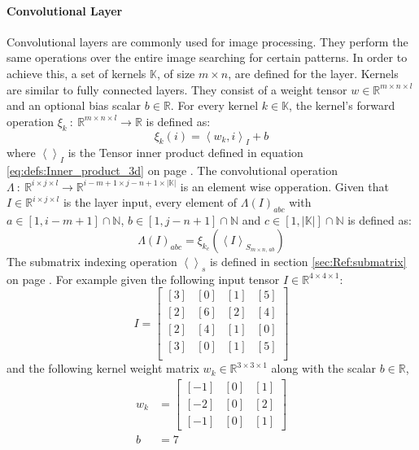 \documentclass[12pt]{article}
\newcommand{\equationref}[1]{equation \ref{#1} on page \pageref{#1}}
\newcommand{\sectionref}[1]{section \ref{#1} on page \pageref{#1}}
\begin{document}
\paragraph{Convolutional Layer}
Convolutional layers are commonly used for image processing. They perform the same operations over the entire image searching for certain patterns. In order to achieve this, a set of kernels \(\mathbb{K}\), of size \(m\times n\), are defined for the layer. Kernels are similar to fully connected layers. They consist of a weight tensor \(w\in\mathbb{R}^{m \times n \times l}\) and an optional bias scalar \(b\in\mathbb{R}\). For every kernel \(k\in \mathbb{K}\), the kernel's forward operation \(\xi_k~:~\mathbb{R}^{m \times n \times l}\to\mathbb{R}\) is defined as:
\begin{equation}\label{eq:NN:kernelOpperation}
\xi_k(i) = \left<w_k, i\right>_I + b
\end{equation}
where \(\left<\right>_I\) is the Tensor inner product defined in \equationref{eq:defs:Inner_product_3d}.
The convolutional operation \(\Lambda~:~\mathbb{R}^{i\times j \times l}\to\mathbb{R}^{i-m+1 \times j-n+1 \times |\mathbb{K}|}\) is an element wise opperation. Given that  \(I \in \mathbb{R}^{i\times j\times l}\) is the layer input, every element of \(\Lambda(I)_{abc}\) with \(a \in [1, i-m+1]\cap\mathbb N\), \(b \in [1, j-n+1]\cap\mathbb N\) and \(c \in [1, |\mathbb{K}|]\cap\mathbb N\) is defined as:
\begin{equation}\label{eq:NN:convolutional_opperation}
\Lambda(I)_{abc} = \xi_{k_c}(\left<I\right>_{S_{m\times n,\,ab}})
\end{equation}
The submatrix indexing operation \(\left<\right>_s\) is defined in \sectionref{sec:Ref:submatrix}.
For example given the following input tensor \(I \in\mathbb{R}^{4\times4\times1}\): %
\[
I = \left[
\begin{matrix}
[3] & [0] & [1] & [5] \\
[2] & [6] & [2] & [4] \\
[2] & [4] & [1] & [0] \\
[3] & [0] & [1] & [5] \\
\end{matrix}
\right]
\]
and the following kernel weight matrix \(w_k \in \mathbb{R}^{3 \times 3 \times 1}\) along with the scalar \(b\in \mathbb{R}\),
\begin{align*}
w_k &= \left[
\begin{matrix}
[-1] & [0] & [1] \\ 
[-2] & [0] & [2] \\
[-1] & [0] & [1]
\end{matrix}
\right]\\
b &=7\\
\end{align*}
\end{document}
